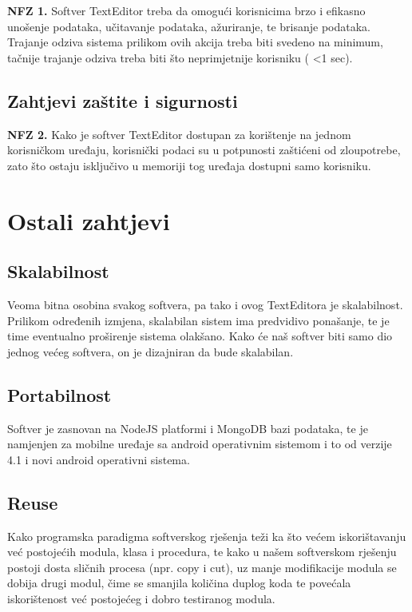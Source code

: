 \documentclass[12pt]{article}
\begin{document}
\textbf{NFZ 1.}  Softver TextEditor treba da omogući korisnicima brzo i efikasno unošenje podataka, učitavanje podataka, ažuriranje, te brisanje podataka. Trajanje odziva sistema prilikom ovih akcija treba biti svedeno na minimum, tačnije trajanje odziva treba biti što neprimjetnije korisniku ( <1 sec).

\subsection{Zahtjevi zaštite i sigurnosti}

\textbf{NFZ 2.}  Kako je softver TextEditor dostupan za korištenje na jednom korisničkom uređaju, korisnički podaci su u potpunosti zaštićeni od zloupotrebe, zato što ostaju isključivo u memoriji tog uređaja dostupni samo korisniku.

\section{Ostali zahtjevi}

\subsection{Skalabilnost}
Veoma bitna osobina svakog softvera, pa tako i ovog TextEditora je skalabilnost. Prilikom određenih izmjena, skalabilan sistem ima predvidivo ponašanje, te je time eventualno proširenje sistema olakšano. Kako će naš softver biti samo dio jednog većeg softvera, on je dizajniran da bude skalabilan.
 
\subsection{Portabilnost}
Softver je zasnovan na NodeJS platformi i MongoDB bazi podataka, te je namjenjen za mobilne uređaje sa android operativnim sistemom i to od verzije 4.1 i novi android operativni sistema.
 
\subsection{Reuse}
Kako programska paradigma softverskog rješenja teži ka što većem iskorištavanju već postojećih modula, klasa i procedura, te kako u našem softverskom rješenju postoji dosta sličnih procesa (npr. copy i cut), uz manje modifikacije modula se dobija drugi modul, čime se smanjila količina duplog koda te povećala iskorištenost već postojećeg i dobro testiranog modula.
 
\end{document}
